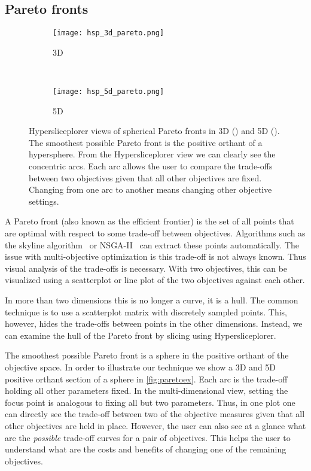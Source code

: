 \subsection{Pareto fronts}
\label{sec:pareto}

\begin{figure} 
  \centering
  \begin{subfigure}[b]{0.45\linewidth}
    \texttt{[image: hsp\_3d\_pareto.png]}
    \caption{3D}
    \label{fig:pareto:3d} 
  \end{subfigure} 
  ~
  \begin{subfigure}[b]{0.45\linewidth}
    \texttt{[image: hsp\_5d\_pareto.png]}
    \caption{5D}
    \label{fig:pareto:5d} 
  \end{subfigure}
  \caption[Hypersliceplorer views of spherical Pareto fronts in 3D and 5D.]{%
    Hypersliceplorer views of spherical Pareto fronts in 3D 
    () and 5D (). 
    The smoothest possible Pareto front is the positive orthant of a 
    hypersphere.  From
    the Hypersliceplorer view we can clearly see the concentric arcs. Each
    arc allows the user to compare the trade-offs between two objectives 
    given that all other objectives are fixed. Changing from one arc to 
    another means changing other objective settings.
  }
  \label{fig:paretoex}
\end{figure}

A Pareto front (also
known as the efficient frontier) is the set of all points that are optimal with
respect to some trade-off between objectives. Algorithms such as the skyline
algorithm~\cite{Borzsony:2001} or NSGA-II~\cite{Deb:2002} can extract these
points automatically. The issue with multi-objective optimization is this
trade-off is not always known. Thus visual analysis of the trade-offs is
necessary. With two objectives, this can be visualized using a scatterplot or
line plot of the two objectives against each other. 

In more than two dimensions this is no longer a curve, it is a hull. The common
technique is to use a scatterplot matrix with discretely sampled points. This, however, hides the trade-offs between
points in the other dimensions. Instead, we can examine the hull of the 
Pareto front by slicing using Hypersliceplorer.

The smoothest possible Pareto front is a sphere in the positive orthant of the objective
space. In order to illustrate our technique we show a 3D and 5D
positive orthant section of a sphere in \autoref{fig:paretoex}.  Each arc is
the trade-off holding all other parameters fixed.  In the multi-dimensional
view, setting the focus point is analogous to fixing all but two parameters.
Thus, in one plot one can directly see the trade-off between two of the 
objective measures given that all other objectives are held in place. However,
the user can also see at a glance what are the \emph{possible} trade-off curves
for a pair of objectives. This helps the user to understand what are the costs
and benefits of changing one of the remaining objectives.

